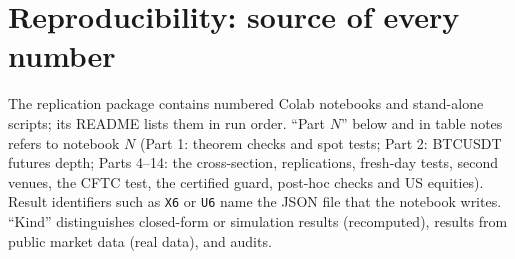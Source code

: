 \documentclass[12pt]{article}
\theoremstyle{definition}
\theoremstyle{remark}
\begin{document}
\section{Reproducibility: source of every number}\label{app:repro}

The replication package contains numbered Colab notebooks and stand-alone scripts; its README lists them in run order. ``Part $N$'' below and in table notes refers to notebook $N$ (Part 1: theorem checks and spot tests; Part 2: BTCUSDT futures depth; Parts 4--14: the cross-section, replications, fresh-day tests, second venues, the CFTC test, the certified guard, post-hoc checks and US equities). Result identifiers such as \texttt{X6} or \texttt{U6} name the JSON file that the notebook writes. ``Kind'' distinguishes closed-form or simulation results (recomputed), results from public market data (real data), and audits.
\end{document}
